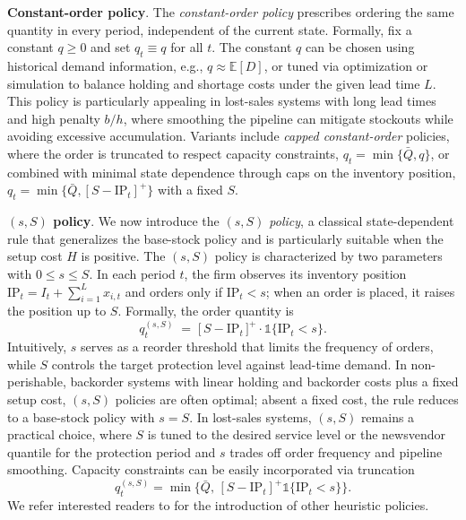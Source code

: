 \documentclass[mnsc,nonblindrev]{informs3_hide}
\begin{document}
\begin{APPENDICES}
\noindent\textbf{Constant-order policy}. The \textit{constant-order policy} prescribes ordering the same quantity in every period, independent of the current state. Formally, fix a constant $q \ge 0$ and set $q_t \equiv q$ for all $t$. The constant $q$ can be chosen using historical demand information, e.g., $q \approx \mathds{E}[D]$, or tuned via optimization or simulation to balance holding and shortage costs under the given lead time $L$. This policy is particularly appealing in lost-sales systems with long lead times and high penalty $b/h$, where smoothing the pipeline can mitigate stockouts while avoiding excessive accumulation. Variants include \textit{capped constant-order} policies, where the order is truncated to respect capacity constraints, $q_t = \min\{\bar{Q}, q\}$, or combined with minimal state dependence through caps on the inventory position, $q_t = \min\{\bar{Q}, [S - \mathrm{IP}_t]^+\}$ with a fixed $S$.

\noindent\textbf{$(s, S)$ policy}.
We now introduce the \textit{$(s, S)$ policy}, a classical state-dependent rule that generalizes the base-stock policy and is particularly suitable when the setup cost $H$ is positive. The $(s, S)$ policy is characterized by two parameters with $0 \le s \le S$. In each period $t$, the firm observes its inventory position $\mathrm{IP}_t = I_t + \sum_{i=1}^L x_{i,t}$ and orders only if $\mathrm{IP}_t < s$; when an order is placed, it raises the position up to $S$. Formally, the order quantity is
\[
q_t^{(s,S)} \;=\; \big[\, S - \mathrm{IP}_t \,\big]^+ \cdot \mathds{1}\{\mathrm{IP}_t < s\}.
\]
Intuitively, $s$ serves as a reorder threshold that limits the frequency of orders, while $S$ controls the target protection level against lead-time demand. In non-perishable, backorder systems with linear holding and backorder costs plus a fixed setup cost, $(s, S)$ policies are often optimal; absent a fixed cost, the rule reduces to a base-stock policy with $s = S$. In lost-sales systems, $(s, S)$ remains a practical choice, where $S$ is tuned to the desired service level or the newsvendor quantile for the protection period and $s$ trades off order frequency and pipeline smoothing. Capacity constraints can be easily incorporated via truncation 
\[
q_t^{(s,S)} = \min\{\bar{Q}, \, [S - \mathrm{IP}_t]^+ \mathds{1}\{\mathrm{IP}_t < s\}\}.
\]
We refer interested readers to \cite{simchi2005logic} for the introduction of other heuristic policies.

\end{APPENDICES}
\end{document}
